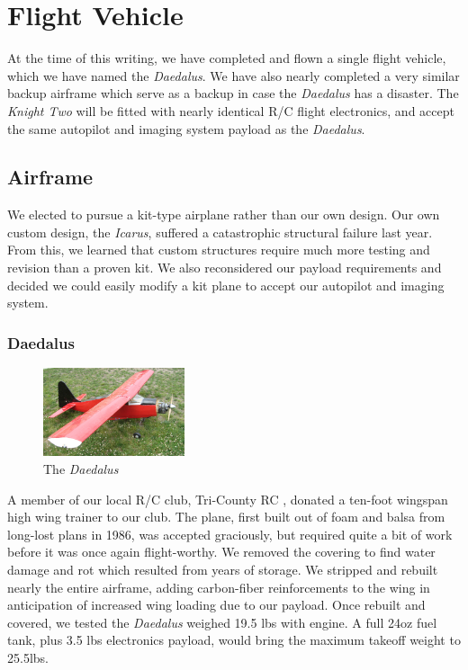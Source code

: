 \documentclass[10pt]{report}
\begin{document}
\section{Flight Vehicle}

At the time of this writing, we have completed and flown a single flight vehicle, which we have named the \emph{Daedalus}.
We have also nearly completed a very similar backup airframe which serve as a backup in case the \emph{Daedalus} has a disaster. The \emph{Knight Two} will be fitted with nearly identical R/C flight electronics, and accept the same autopilot and imaging system payload as the \emph{Daedalus}.

\subsection{Airframe}

We elected to pursue a kit-type airplane rather than our own design. 
Our own custom design, the \emph{Icarus}, suffered a catastrophic structural failure last year. From this, we learned that custom structures require much more testing and revision than a proven kit. We also reconsidered our payload requirements and decided we could easily modify a kit plane to accept our autopilot and imaging system.



\subsubsection{Daedalus}
\begin{figure}
	\includegraphics[width=0.37\textwidth]{../images/daedalus_isometric.jpg}
	\caption{The \emph{Daedalus}}
	\label{fig:daedalus}
\end{figure}
A member of our local R/C club, Tri-County RC \cite{tricountyRC}, donated a ten-foot wingspan high wing trainer to our club. The plane, first built out of foam and balsa from long-lost plans in 1986, was accepted graciously, but required quite a bit of work before it was once again flight-worthy. We removed the covering to find water damage and rot which resulted from years of storage. We stripped and rebuilt nearly the entire airframe, adding carbon-fiber reinforcements to the wing in anticipation of increased wing loading due to our payload. Once rebuilt and covered, we tested the \emph{Daedalus} weighed 19.5 lbs with engine. A full 24oz fuel tank, plus 3.5 lbs electronics payload, would bring the maximum takeoff weight to 25.5lbs.
\end{document}
